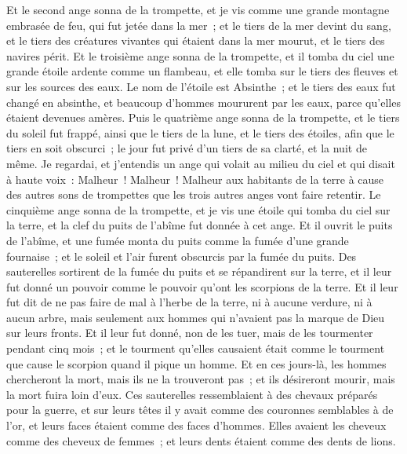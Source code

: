 \begin{multicols}{2}
Et le second ange sonna de la trompette, et je vis comme une grande montagne embrasée de feu, qui fut jetée dans la mer~; et le tiers de la mer devint du sang,
et le tiers des créatures vivantes qui étaient dans la mer mourut, et le tiers des navires périt.
Et le troisième ange sonna de la trompette, et il tomba du ciel une grande étoile ardente comme un flambeau, et elle tomba sur le tiers des fleuves et sur les sources des eaux.
Le nom de l'étoile est Absinthe~; et le tiers des eaux fut changé en absinthe, et beaucoup d'hommes moururent par les eaux, parce qu'elles étaient devenues amères.
Puis le quatrième ange sonna de la trompette, et le tiers du soleil fut frappé, ainsi que le tiers de la lune, et le tiers des étoiles, afin que le tiers en soit obscurci~; le jour fut privé d'un tiers de sa clarté, et la nuit de même.
Je regardai, et j'entendis un ange qui volait au milieu du ciel et qui disait à haute voix~: Malheur~! Malheur~! Malheur aux habitants de la terre à cause des autres sons de trompettes que les trois autres anges vont faire retentir.
\VerseOne{}Le cinquième ange sonna de la trompette, et je vis une étoile qui tomba du ciel sur la terre, et la clef du puits de l'abîme fut donnée à cet ange.
Et il ouvrit le puits de l'abîme, et une fumée monta du puits comme la fumée d'une grande fournaise~; et le soleil et l'air furent obscurcis par la fumée du puits.
Des sauterelles sortirent de la fumée du puits et se répandirent sur la terre, et il leur fut donné un pouvoir comme le pouvoir qu'ont les scorpions de la terre.
Et il leur fut dit de ne pas faire de mal à l'herbe de la terre, ni à aucune verdure, ni à aucun arbre, mais seulement aux hommes qui n'avaient pas la marque de Dieu sur leurs fronts.
Et il leur fut donné, non de les tuer, mais de les tourmenter pendant cinq mois~; et le tourment qu'elles causaient était comme le tourment que cause le scorpion quand il pique un homme.
Et en ces jours-là, les hommes chercheront la mort, mais ils ne la trouveront pas~; et ils désireront mourir, mais la mort fuira loin d'eux.
Ces sauterelles ressemblaient à des chevaux préparés pour la guerre, et sur leurs têtes il y avait comme des couronnes semblables à de l'or, et leurs faces étaient comme des faces d'hommes.
Elles avaient les cheveux comme des cheveux de femmes~; et leurs dents étaient comme des dents de lions.

\end{multicols}
